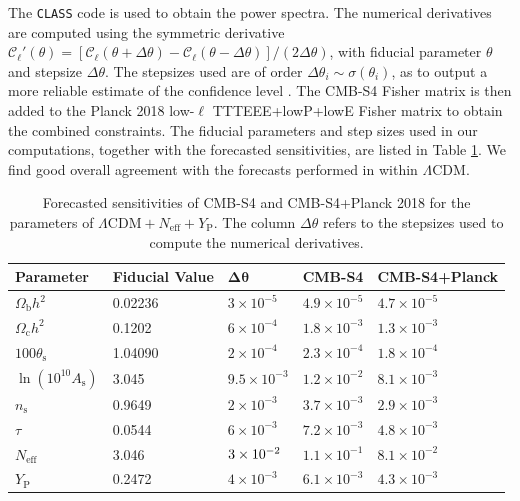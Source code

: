 \documentclass[notitlepage,letterpaper,natbib,aps,prd,onecolumn,amsmath,amsfonts,nofootinbib,preprintnumbers,superscriptaddress,secnumarabic,groupedaddress]{revtex4-1}
\begin{document}
The \texttt{CLASS} code \cite{Blas:2011rf} is used to obtain the power spectra. The numerical derivatives are computed using the symmetric derivative $\mathcal{C}_\ell'(\theta) = \left[\mathcal{C}_\ell(\theta+\Delta\theta)-\mathcal{C}_\ell(\theta-\Delta\theta)\right]/(2\Delta\theta)$, with fiducial parameter $\theta$ and stepsize $\Delta\theta$. The stepsizes used are of order $\Delta\theta_i \sim \sigma(\theta_i)$, as to output a more reliable estimate of the confidence level \cite{Perotto:2006rj}. The CMB-S4 Fisher matrix is then added to the Planck 2018 low-$\ell$ TTTEEE+lowP+lowE Fisher matrix to obtain the combined constraints. The fiducial parameters and step sizes used in our computations, together with the forecasted sensitivities, are listed in Table \ref{tab:FisherResults}. We find good overall agreement with the forecasts performed in \cite{Abazajian:2016yjj} within $\Lambda$CDM. 

\begin{table}[!ht]
\begin{center}
{\def\arraystretch{1.35}
\begin{tabular}{p{2cm}|p{2.5cm}|p{2cm}|p{2cm}|p{3cm}}
\hline\hline
	\hfil \textbf{Parameter} &\hfil  \textbf{Fiducial Value} &\hfil  $\boldsymbol{\Delta\theta}$ &\hfil  \textbf{CMB-S4} &\hfil  \textbf{CMB-S4+Planck} \\ \hline\hline
   	\hfil $\Omega_\mathrm{b}h^2$ &\hfil  0.02236 & \hfil $3\times 10^{-5}$ &\hfil $4.9\times 10^{-5}$ &\hfil  $4.7\times 10^{-5}$\\ \hline
   	\hfil $\Omega_\mathrm{c}h^2$ &\hfil  0.1202 & \hfil $6\times 10^{-4}$ &\hfil $1.8\times 10^{-3}$ &\hfil  $1.3\times 10^{-3}$\\ \hline
   	\hfil $100\theta_\mathrm{s}$ &\hfil  1.04090 &\hfil  $2\times 10^{-4}$ &\hfil  $2.3\times 10^{-4}$&\hfil  $1.8\times 10^{-4}$\\ \hline
   	\hfil $\ln(10^{10}A_\mathrm{s})$ &\hfil  3.045 & \hfil $9.5\times 10^{-3}$  &\hfil  $1.2\times 10^{-2}$ &\hfil  $8.1\times 10^{-3}$\\ \hline
   	\hfil $n_\mathrm{s}$ &\hfil  0.9649 & \hfil  $2\times 10^{-3}$ &\hfil  $3.7\times 10^{-3}$ &\hfil  $2.9\times 10^{-3}$\\ \hline
   	\hfil $\tau$ & \hfil 0.0544 & \hfil $6\times 10^{-3}$ & \hfil $7.2\times 10^{-3}$ & \hfil $4.8\times 10^{-3}$\\ \hline
   	\hfil $N_\mathrm{eff}$ & \hfil 3.046 &$ \hfil 3\times 10^{-2}$ & \hfil $1.1\times 10^{-1}$ & \hfil $8.1\times 10^{-2}$\\ \hline
   	\hfil $Y_\mathrm{P}$ & \hfil 0.2472 & \hfil $4\times 10^{-3}$ & \hfil $6.1\times 10^{-3}$ & \hfil $4.3\times 10^{-3}$\\  \hline \hline

\end{tabular}
}
\end{center}
\vspace{-0.2cm}
\caption{Forecasted sensitivities of CMB-S4 and CMB-S4+Planck 2018 for the parameters of $\Lambda\mathrm{CDM}+N_\mathrm{eff}+Y_\mathrm{P}$. The column $\Delta\theta$ refers to the stepsizes used to compute the numerical derivatives.}
\label{tab:FisherResults}
\end{table}
\end{document}
